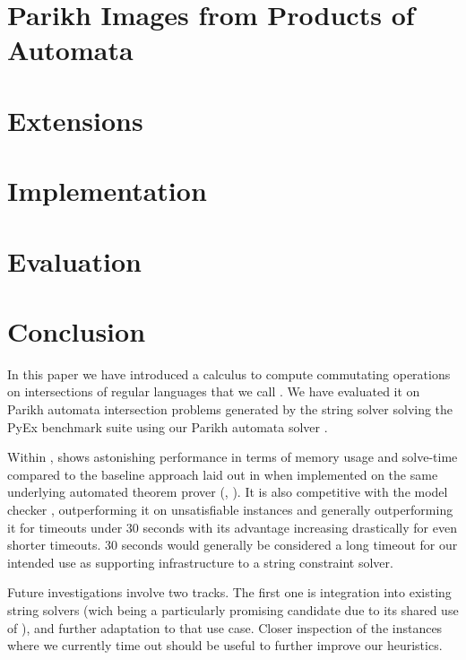 \documentclass[acmsmall,review,anonymous,screen]{acmart}\settopmatter{printfolios=true,printccs=true,printacmref=true}
\theoremstyle{definition}
\begin{document}
\section{Parikh Images from Products of Automata}\label{sec:multiple}



\section{Extensions}\label{sec:extensions}


\section{Implementation}\label{sec:implementation}


\section{Evaluation}\label{sec:experiments}


\section{Conclusion}

In this paper we have introduced a calculus to compute commutating operations on
intersections of regular languages that we call \Calculus{}. We have evaluated
it on \NrBenchmarks{} Parikh automata intersection problems generated by the
\OstrichPlus{} string solver \cite{ostrich-plus} solving the PyEx benchmark
suite \cite{pyex} using our Parikh automata solver \Catra{}.

Within \Catra{}, \Calculus{} shows astonishing performance in terms of memory
usage and solve-time compared to the baseline approach laid out in
\cite{generate-parikh-image} when implemented on the same underlying automated
theorem prover (\Princess{}, \cite{princess}). It is also competitive with the
\Nuxmv{} model checker \cite{nuxmv}, outperforming it on unsatisfiable instances
and generally outperforming it for timeouts under 30 seconds with its advantage
increasing drastically for even shorter timeouts. 30 seconds would generally be
considered a long timeout for our intended use as supporting infrastructure to a
string constraint solver.

Future investigations involve two tracks. The first one is integration into
existing string solvers (wich \Ostrich{} being a particularly promising
candidate due to its shared use of \Princess{}), and further adaptation to that
use case. Closer inspection of the instances where we currently time out should
be useful to further improve our heuristics.
\end{document}
